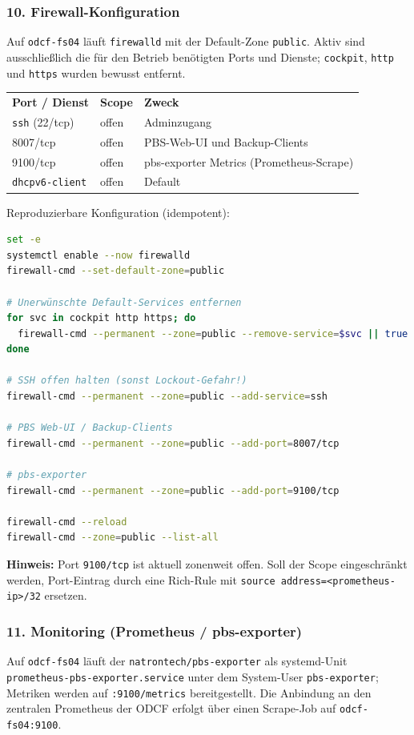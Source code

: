 \subsubsection*{10. Firewall-Konfiguration}
Auf \texttt{odcf-fs04} läuft \texttt{firewalld} mit der Default-Zone
\texttt{public}. Aktiv sind ausschließlich die für den Betrieb
benötigten Ports und Dienste; \texttt{cockpit}, \texttt{http} und
\texttt{https} wurden bewusst entfernt.

\begin{tabular}{lll}
\rowcolor{heading}\textbf{Port / Dienst} & \textbf{Scope} & \textbf{Zweck} \\
\texttt{ssh} (22/tcp) & offen & Adminzugang \\
\rowcolor{odd}8007/tcp & offen & \ac{PBS}-Web-UI und Backup-Clients \\
9100/tcp & offen & pbs-exporter Metrics (Prometheus-Scrape) \\
\rowcolor{odd}\texttt{dhcpv6-client} & offen & Default \\
\end{tabular}

Reproduzierbare Konfiguration (idempotent):
\begin{lstlisting}[language=bash,caption={Firewall-Endzustand setzen}]
set -e
systemctl enable --now firewalld
firewall-cmd --set-default-zone=public

# Unerwünschte Default-Services entfernen
for svc in cockpit http https; do
  firewall-cmd --permanent --zone=public --remove-service=$svc || true
done

# SSH offen halten (sonst Lockout-Gefahr!)
firewall-cmd --permanent --zone=public --add-service=ssh

# PBS Web-UI / Backup-Clients
firewall-cmd --permanent --zone=public --add-port=8007/tcp

# pbs-exporter
firewall-cmd --permanent --zone=public --add-port=9100/tcp

firewall-cmd --reload
firewall-cmd --zone=public --list-all
\end{lstlisting}

\noindent\textbf{Hinweis:} Port \texttt{9100/tcp} ist aktuell
zonenweit offen. Soll der Scope eingeschränkt werden, Port-Eintrag
durch eine Rich-Rule mit \texttt{source address=<prometheus-ip>/32}
ersetzen.

\subsubsection*{11. Monitoring (Prometheus / pbs-exporter)}
Auf \texttt{odcf-fs04} läuft der \texttt{natrontech/pbs-exporter}
als systemd-Unit \texttt{prometheus-pbs-exporter.service} unter dem
System-User \texttt{pbs-exporter}; Metriken werden auf
\texttt{:9100/metrics} bereitgestellt. Die Anbindung an den
zentralen Prometheus der \ac{ODCF} erfolgt über einen
Scrape-Job auf \texttt{odcf-fs04:9100}.

